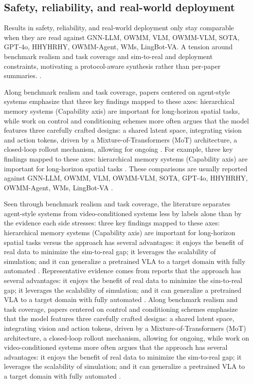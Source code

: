 \documentclass[a4paper,11pt]{article}
\begin{document}
\subsection{Safety, reliability, and real-world deployment}


Results in safety, reliability, and real-world deployment only stay comparable when they are read against GNN-LLM, OWMM, VLM, OWMM-VLM, SOTA, GPT-4o, HHYHRHY, OWMM-Agent, WMs, LingBot-VA. A tension around benchmark realism and task coverage and sim-to-real and deployment constraints, motivating a protocol-aware synthesis rather than per-paper summaries. \citep{Fang2025From,Fang2025Saga,Field2025Text2Touch,Francis2021Core}.

Along benchmark realism and task coverage, papers centered on agent-style systems emphasize that three key findings mapped to these axes: hierarchical memory systems (Capability axis) are important for long-horizon spatial tasks, while work on control and conditioning schemes more often argues that the model features three carefully crafted designs: a shared latent space, integrating vision and action tokens, driven by a Mixture-of-Transformers (MoT) architecture, a closed-loop rollout mechanism, allowing for ongoing \citep{Felicia2026From,Li2026Causal,Brohan2022Robotics}. For example, three key findings mapped to these axes: hierarchical memory systems (Capability axis) are important for long-horizon spatial tasks \citep{Felicia2026From}. These comparisons are usually reported against GNN-LLM, OWMM, VLM, OWMM-VLM, SOTA, GPT-4o, HHYHRHY, OWMM-Agent, WMs, LingBot-VA \citep{Felicia2026From,Chen2025Owmm,Baraldi2025Safety,Li2026Causal}.

Seen through benchmark realism and task coverage, the literature separates agent-style systems from video-conditioned systems less by labels alone than by the evidence each side stresses: three key findings mapped to these axes: hierarchical memory systems (Capability axis) are important for long-horizon spatial tasks versus the approach has several advantages: it enjoys the benefit of real data to minimize the sim-to-real gap; it leverages the scalability of simulation; and it can generalize a pretrained VLA to a target domain with fully automated \citep{Felicia2026From,Fang2025Rebot}. Representative evidence comes from reports that the approach has several advantages: it enjoys the benefit of real data to minimize the sim-to-real gap; it leverages the scalability of simulation; and it can generalize a pretrained VLA to a target domain with fully automated \citep{Fang2025Rebot}. Along benchmark realism and task coverage, papers centered on control and conditioning schemes emphasize that the model features three carefully crafted designs: a shared latent space, integrating vision and action tokens, driven by a Mixture-of-Transformers (MoT) architecture, a closed-loop rollout mechanism, allowing for ongoing, while work on video-conditioned systems more often argues that the approach has several advantages: it enjoys the benefit of real data to minimize the sim-to-real gap; it leverages the scalability of simulation; and it can generalize a pretrained VLA to a target domain with fully automated \citep{Li2026Causal,Brohan2022Robotics,Fang2025Rebot}.
\end{document}
